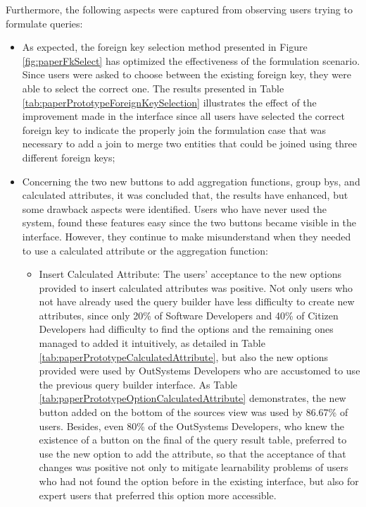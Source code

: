 Furthermore, the following aspects were captured from observing users trying to formulate queries:

\begin{itemize}
  \item As expected, the foreign key selection method presented in Figure \ref{fig:paperFkSelect} has optimized the effectiveness of the formulation scenario. Since users were asked to choose between the existing foreign key, they were able to select the correct one. The results presented in Table \ref{tab:paperPrototypeForeignKeySelection} illustrates the effect of the improvement made in the interface since all users have selected the correct foreign key to indicate the properly join the formulation case that was necessary to add a join to merge two entities that could be joined using three different foreign keys;
  \item Concerning the two new buttons to add aggregation functions, group bys, and calculated attributes, it was concluded that, the results have enhanced, but some drawback aspects were identified. Users who have never used the system, found these features easy since the two buttons became visible in the interface. However, they continue to make misunderstand when they needed to use a calculated attribute or the aggregation function:
  \begin{itemize}
    \item Insert Calculated Attribute: The users' acceptance to the new options provided to insert calculated attributes was positive. Not only users who not have already used the query builder have less difficulty to create new attributes, since only 20\% of Software Developers and 40\% of Citizen Developers had difficulty to find the options and the remaining ones managed to added it intuitively, as detailed in Table \ref{tab:paperPrototypeCalculatedAttribute}, but also the new options provided were used by OutSystems Developers who are accustomed to use the previous query builder interface. As Table \ref{tab:paperPrototypeOptionCalculatedAttribute} demonstrates, the new button added on the bottom of the sources view was used by 86.67\% of users. Besides, even 80\% of the OutSystems Developers, who knew the existence of a button on the final of the query result table, preferred to use the new option to add the attribute, so that the acceptance of that changes was positive not only to mitigate learnability problems of users who had not found the option before in the existing interface, but also for expert users that preferred this option more accessible.
  \end{itemize}
\end{itemize}

